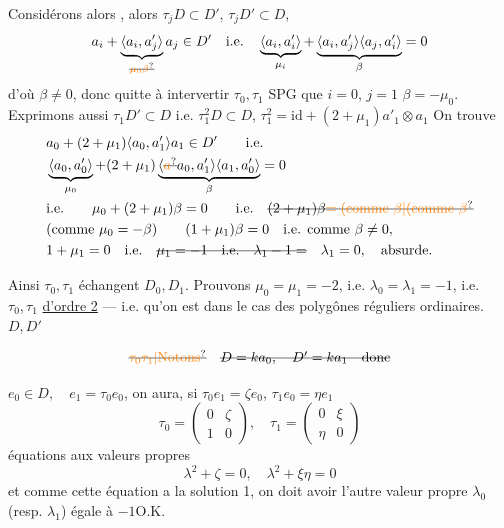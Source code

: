 Considérons alors  , alors $\tau_jD\subset D'$, $\tau_jD'\subset D$,
\[
a_i+\underbrace{\langle a_i,a'_j\rangle}_{\deleted{\unsure{\mu_0\beta}}}a_j\in D'
\quad\text{i.e.}\quad
\underbrace{\langle a_i,a'_i\rangle}_{\mu_i}
+\underbrace{\langle a_i,a'_j\rangle\langle a_j,a'_i\rangle}_{\beta}=0
\]
d'où $\beta\ne0$, donc quitte à intervertir $\tau_0,\tau_1$ SPG que $i=0$, $j=1$ \quad $\beta=-\mu_0$. Exprimons aussi $\tau_1D'\subset D$ i.e. $\tau_1^2D\subset D$, $\tau_1^2=\mathrm{id}+(2+\mu_1)a'_1\otimes a_1$
On trouve
\[
\begin{aligned}
&a_0+(2+\mu_1)\langle a_0,a'_1\rangle a_1\in D'\qquad\text{i.e.}\\
&\underbrace{\langle a_0,a'_0\rangle}_{\mu_0}+
(2+\mu_1)\underbrace{\langle\deleted{\unsure{a}}a_0,a'_1\rangle
\langle a_1,a'_0\rangle}_{\beta}=0\\
&\text{i.e.}\qquad \mu_0+(2+\mu_1)\beta=0\qquad\text{i.e.}\quad
\deleted{(2+\mu_1)\beta\unsure{=(\text{comme }\beta|(\text{comme }\beta}}\\
&(\text{comme }\mu_0=-\beta)\qquad(1+\mu_1)\beta=0\quad\text{i.e. comme }\beta\ne0,\\
&1+\mu_1=0\quad\text{i.e.}\quad
\deleted{\mu_1=-1\quad\text{i.e.}\quad\lambda_1-1=}\quad
\lambda_1=0,\quad\text{absurde.}
\end{aligned}
\]

Ainsi $\tau_0,\tau_1$ échangent $D_0,D_1$. Prouvons   $\mu_0=\mu_1=-2$, i.e. $\lambda_0=\lambda_1=-1$, i.e. $\tau_0,\tau_1$ \uline{d'ordre 2} --- i.e. qu'on est dans le cas des polygônes réguliers ordinaires.   $D,D'$

\[
\deleted{\unsure{\tau_0\tau_1|\text{Notons}}}\quad
\deleted{D=ka_0,\quad D'=ka_1\quad\text{donc}}
\]

$e_0\in D,\quad e_1=\tau_0e_0$, on aura, si $\tau_0e_1=\zeta e_0$, $\tau_1e_0=\eta e_1$ 
\[
\tau_0=\begin{pmatrix}0&\zeta\\1&0\end{pmatrix},\quad
\tau_1=\begin{pmatrix}0&\xi\\\eta&0\end{pmatrix}
\]
équations aux valeurs propres
\[
\lambda^2+\zeta=0,\quad\lambda^2+\xi\eta=0
\]
et comme cette équation a la  solution 1, on doit avoir l'autre valeur propre $\lambda_0$ (resp. $\lambda_1$) égale à $-1$\quad O.K.

